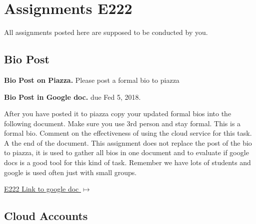 \section{Assignments E222}
\label{s:e222-assignment}
\label{s:e222-assignments}

All assignments posted here are supposed to be conducted by you. 

\subsection{Bio Post}
\label{E:e222-bio}

\begin{exercise}\label{E:e222-bio-piazza}
{\bf Bio Post on Piazza.} Please post a formal bio to piazza
\end{exercise}


\begin{exercise}\label{E:e222-bio-googledocs}

  {\bf Bio Post in Google doc.} due Fed 5, 2018. 
  
  After you have posted it to piazza
  copy your updated formal bios into the following document.  Make
  sure you use 3rd person and stay formal. This is a formal
  bio. Comment on the effectiveness of using the cloud service for
  this task. A the end of the document. This assignment does not
  replace the post of the bio to piazza, it is used to gather all bios
  in one document and to evaluate if google docs is a good tool for
  this kind of task. Remember we have lots of students and google is
  used often just with small groups.
 
 \smallskip

 {\hfill
   \href{https://docs.google.com/document/d/1pNK94qoRfZkill_JrGAzjd8aQ6Aar0pEXhU_Tgog0W0/edit?usp=sharing}{E222
     Link to google doc $\mapsto$}}


 \end{exercise}


\subsection{Cloud Accounts}
\label{E:e222-iu-google-services}

